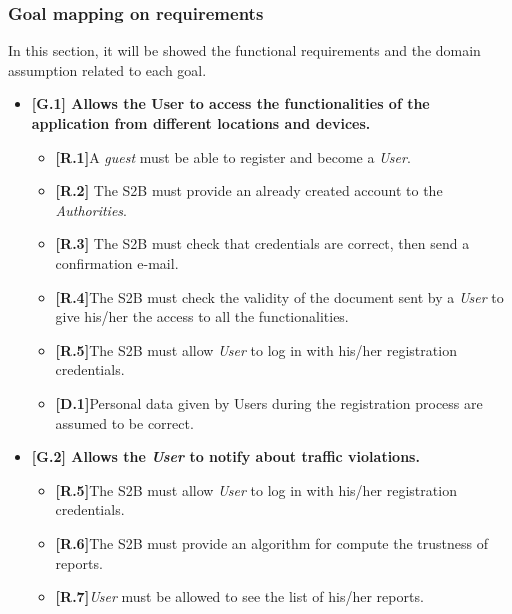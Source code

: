 \subsubsection{Goal mapping on requirements}






In this section, it will be showed the functional requirements and the domain assumption related to each goal.
\begin{itemize}


\item \textbf{{[G.1]} Allows the User to access the functionalities of the application from different locations and devices.}
\begin{itemize}
    \item \textbf{[R.1]}A \textit{guest} must be able to register and become a \textit{User}.
    
     \item \textbf{[R.2]} The S2B must provide an already created account to the \textit{Authorities}.
    
    \item \textbf{[R.3]} The S2B must check that credentials are correct, then send a confirmation e-mail.
    
     \item \textbf{[R.4]}The S2B must check the validity of the document sent by a \textit{User} to give his/her the access to all the functionalities.
     
      \item \textbf{[R.5]}The S2B must allow \textit{User} to log in with his/her registration credentials.
      
       \item \textbf{[D.1]}Personal data given by Users during the registration process are assumed to be correct.
\end{itemize}

\item \textbf{{[G.2]} Allows the \textit{User} to notify about traffic violations.}
\begin{itemize}
        \item \textbf{[R.5]}The S2B must allow \textit{User} to log in with his/her registration credentials.
        
        \item \textbf{[R.6]}The S2B must provide an algorithm for compute the trustness of reports.
        
        \item \textbf{[R.7]}\textit{User} must be allowed to see the list of his/her reports.
        

\end{itemize}
\end{itemize}
